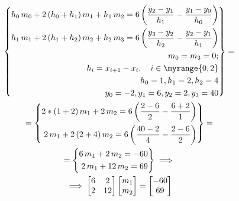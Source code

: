 \documentclass["CN_A-Exercises_Resolutions.tex"]{subfiles}
\begin{document}
\begin{questionBox}
  \answer{}
  \begin{gather*}
    \left\{
      \begin{aligned}
        h_0\,m_0
        + 2\,(h_0+h_1)\,m_1
        + h_1\,m_2
        = 6\left(
          \frac{y_2-y_1}{h_1}
          -\frac{y_1-y_0}{h_0}
        \right)
        \\
        h_1\,m_1
        + 2\,(h_1+h_2)\,m_2
        + h_2\,m_3
        = 6\left(
          \frac{y_3-y_2}{h_2}
          -\frac{y_2-y_1}{h_1}
        \right)
        \\
        m_0=m_3=0;
        \\
        h_i=x_{i+1}-x_i,\quad i\in\myrange{0,2}
        \\
        h_0=1,
        h_1=2,
        h_2=4
        \\
        y_0=- 2,
        y_1=  6,
        y_2=  2,
        y_3= 40
      \end{aligned}
    \right\}
    = \\
    = \left\{
      \begin{aligned}
        2*(1+2)\,m_1
        + 2\,m_2
        = 6\left(
          \frac{2-6}{2}
          -\frac{6+2}{1}
        \right)
        \\
        2\,m_1
        + 2\,(2+4)\,m_2
        = 6\left(
          \frac{40-2}{4}
          -\frac{2-6}{2}
        \right)
      \end{aligned}
    \right\}
    = \\
    = \left\{
      \begin{aligned}
        6\,m_1
        + 2\,m_2
        = -60
        \\
        2\,m_1
        + 12\,m_2
        = 69
      \end{aligned}
    \right\}
    \implies \\
    \implies
    \begin{bmatrix}
      6 & 2
      \\ 2 & 12
    \end{bmatrix}
    \begin{bmatrix}
      m_1\\m_2
    \end{bmatrix}
    = \begin{bmatrix}
      -60\\69
    \end{bmatrix}
  \end{gather*}


\end{questionBox}
\end{document}
